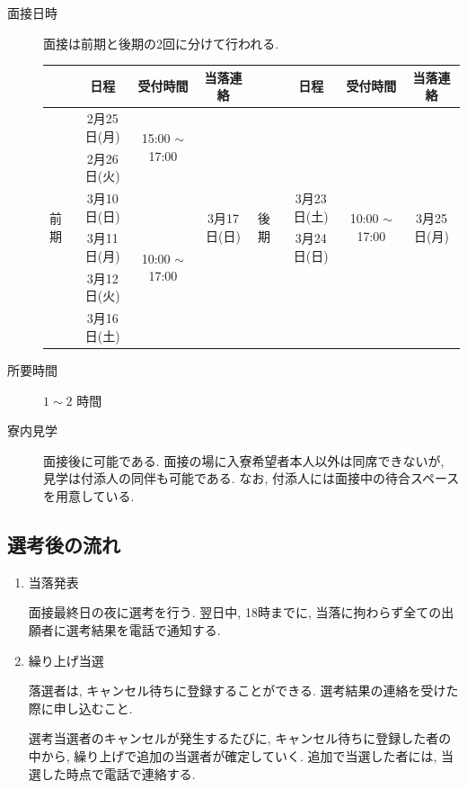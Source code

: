 \documentclass[10pt,b5jsbook,dvips,dvipdfmx,openany]{jsbook}
\theoremstyle{definition}
\begin{document}
		\begin{description}
		\item[面接日時] 面接は前期と後期の2回に分けて行われる. %
		
\begin{table}[htb]
  \begin{tabular}{|l|c|c|c||l|c|c|c|} \hline
    		& 日程 & 受付時間  & 当落連絡 &	& 日程 & 受付時間 & 当落連絡 \\ \hline \hline
    \multirow{6}{*}{前期}
      		& 2月25日(月)& \multirow{2}{*}{15:00 $ \sim $ 17:00 }& \multirow{6}{*}{3月17日(日)} &\multirow{6}{*}{後期} & &  \multirow{6}{*}{10:00 $ \sim $ 17:00} & \multirow{6}{*}{3月25日(月)} \\ 
    		& 2月26日(火)&  & & & & &\\ \cline{2-3}
      		& 3月10日(日)&  \multirow{4}{*}{10:00 $ \sim $ 17:00}& & & 3月23日(土) & &\\ 
    	  	& 3月11日(月)& & & & 3月24日(日)& &\\ 
      		& 3月12日(火)& & & & & &\\ 
     		& 3月16日(土)& & & & & &\\ \hline 
  \end{tabular}
\end{table}


		\item[所要時間] $1 \sim 2 $ 時間
		\item[寮内見学] 面接後に可能である. 面接の場に入寮希望者本人以外は同席できないが, 見学は付添人の同伴も可能である. なお, 付添人には面接中の待合スペースを用意している. 
		\end{description}

		\subsection{選考後の流れ}
		\begin{enumerate}
		\item 当落発表
		
		面接最終日の夜に選考を行う. 翌日中, 18時までに, 当落に拘わらず全ての出願者に選考結果を電話で通知する. 
		\item 繰り上げ当選

 		落選者は, キャンセル待ちに登録することができる. 選考結果の連絡を受けた際に申し込むこと. 

 		選考当選者のキャンセルが発生するたびに, キャンセル待ちに登録した者の中から, 繰り上げで追加の当選者が確定していく. 追加で当選した者には, 当選した時点で電話で連絡する. 
		\end{enumerate}
\end{document}
